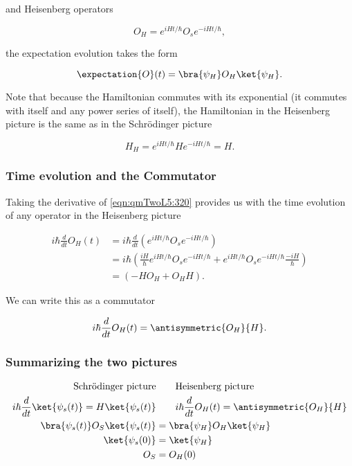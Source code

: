 and Heisenberg operators

\begin{equation}\label{eqn:qmTwoL5:320}
O_H = e^{i H t/\hbar} O_s e^{-i H t/\hbar},
\end{equation}

the expectation evolution takes the form

\begin{equation}\label{eqn:qmTwoL5:340}
\expectation{O}(t) = 
\bra{\psi_H} 
O_H
\ket{\psi_H}.
\end{equation}

Note that because the Hamiltonian commutes with its exponential (it commutes with itself and any power series of itself), the Hamiltonian in the Heisenberg picture is the same as in the Schr\"{o}dinger picture

\begin{equation}\label{eqn:qmTwoL5:360}
H_H = e^{i H t/\hbar} H e^{-i H t/\hbar} = H.
\end{equation}

\subsubsection{Time evolution and the Commutator}

Taking the derivative of \ref{eqn:qmTwoL5:320} provides us with the time evolution of any operator in the Heisenberg picture

\begin{align*}
i \hbar \frac{d}{dt} O_H(t) 
&=
i \hbar \frac{d}{dt} \left( 
e^{i H t/\hbar} O_s e^{-i H t/\hbar}
\right) \\
&=
i \hbar \left( 
\frac{i H}{\hbar} e^{i H t/\hbar} O_s e^{-i H t/\hbar}
+
e^{i H t/\hbar} O_s e^{-i H t/\hbar} \frac{-i H}{\hbar} 
\right) \\
&=
\left( 
-H O_H
+
O_H H
\right).
\end{align*}

We can write this as a commutator

\begin{equation}\label{eqn:qmTwoL5:380}
i \hbar \frac{d}{dt} O_H(t) = \antisymmetric{O_H}{H}.
\end{equation}

\subsubsection{Summarizing the two pictures}

\begin{align*}
\text{Schr\"{o}dinger picture} &\qquad \text{Heisenberg picture} \\
i \hbar \frac{d}{dt} \ket{\psi_s(t)} = H \ket{\psi_s(t)} &\qquad i \hbar \frac{d}{dt} O_H(t) = \antisymmetric{O_H}{H} \\
\bra{\psi_s(t)} O_S \ket{\psi_s(t)} &= \bra{\psi_H} O_H \ket{\psi_H} \\
\ket{\psi_s(0)} &= \ket{\psi_H} \\
O_S &= O_H(0)
\end{align*}


